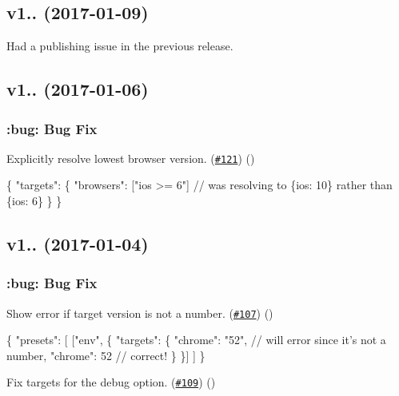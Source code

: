 \subsection*{v1.. (2017-\/01-\/09)}

Had a publishing issue in the previous release.

\subsection*{v1.. (2017-\/01-\/06)}

\subsubsection*{\+:bug\+: Bug Fix}


\begin{DoxyItemize}
\item Explicitly resolve lowest browser version. (\href{https://github.com/babel/babel-preset-env/pull/121}{\tt \#121}) ()
\end{DoxyItemize}


\begin{DoxyCode}
\{
  "targets": \{
    "browsers": ["ios >= 6"] // was resolving to \{ios: 10\} rather than \{ios: 6\}
  \}
\}
\end{DoxyCode}


\subsection*{v1.. (2017-\/01-\/04)}

\subsubsection*{\+:bug\+: Bug Fix}


\begin{DoxyItemize}
\item Show error if target version is not a number. (\href{https://github.com/babel/babel-preset-env/pull/107}{\tt \#107}) ()
\end{DoxyItemize}


\begin{DoxyCode}
\{
  "presets": [
    ["env", \{
      "targets": \{
        "chrome": "52", // will error since it's not a number,
        "chrome": 52 // correct!
      \}
    \}]
  ]
\}
\end{DoxyCode}



\begin{DoxyItemize}
\item Fix targets for the {\ttfamily debug} option. (\href{https://github.com/babel/babel-preset-env/pull/109}{\tt \#109}) ()
\end{DoxyItemize}

